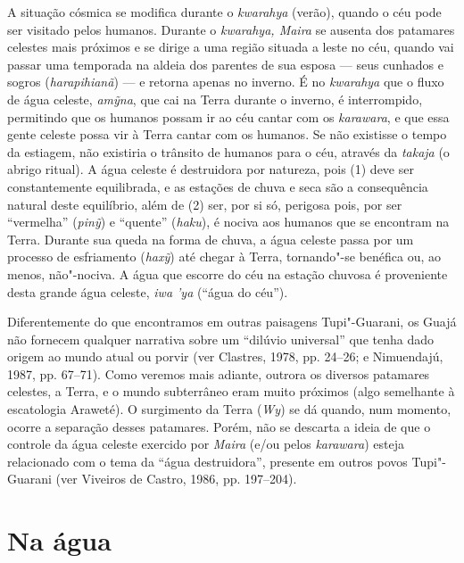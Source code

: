 A situação cósmica se modifica durante o \emph{kwarahya} (verão), quando
o céu pode ser visitado pelos humanos. Durante o \emph{kwarahya, Maira}
se ausenta dos patamares celestes mais próximos e se dirige a uma região
situada a leste no céu, quando vai passar uma temporada na aldeia dos
parentes de sua esposa --- seus cunhados e sogros (\emph{harapihianã}) --- e
retorna apenas no inverno. É no \emph{kwarahya} que o fluxo de água
celeste, \emph{amỹna}, que cai na Terra durante o inverno, é
interrompido, permitindo que os humanos possam ir ao céu cantar com os
\emph{karawara}, e que essa gente celeste possa vir à Terra cantar com
os humanos. Se não existisse o tempo da estiagem, não existiria o
trânsito de humanos para o céu, através da \emph{takaja} (o abrigo
ritual). A água celeste é destruidora por natureza, pois (1) deve ser
constantemente equilibrada, e as estações de chuva e seca são a
consequência natural deste equilíbrio, além de (2) ser, por si só,
perigosa pois, por ser ``vermelha'' (\emph{pinỹ}) e ``quente''
(\emph{haku}), é nociva aos humanos que se encontram na Terra. Durante
sua queda na forma de chuva, a água celeste passa por um processo de
esfriamento (\emph{haxỹ}) até chegar à Terra, tornando"-se benéfica ou,
ao menos, não"-nociva. A água que escorre do céu na estação chuvosa é
proveniente desta grande água celeste, \emph{iwa 'ya} (``água do céu'').

Diferentemente do que encontramos em outras paisagens Tupi"-Guarani, os
Guajá não fornecem qualquer narrativa sobre um ``dilúvio universal'' que
tenha dado origem ao mundo atual ou porvir (ver Clastres, 1978, pp.
24--26; e Nimuendajú, 1987, pp. 67--71). Como veremos mais adiante, outrora
os diversos patamares celestes, a Terra, e o mundo subterrâneo eram
muito próximos (algo semelhante à escatologia Araweté). O surgimento da
Terra (\emph{Wy}) se dá quando, num momento, ocorre a separação desses
patamares. Porém, não se descarta a ideia de que o controle da água
celeste exercido por \emph{Maira} (e/ou pelos \emph{karawara}) esteja
relacionado com o tema da ``água destruidora'', presente em outros povos
Tupi"-Guarani (ver Viveiros de Castro, 1986, pp. 197--204).

\section{Na água}\label{na-uxe1gua}

